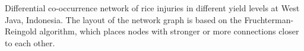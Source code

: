Differential co-occurrence network of rice injuries in different yield levels at West Java, Indonesia. The layout of the network graph is based on the Fruchterman-Reingold algorithm, which places nodes with stronger or more connections closer to each other.
        \label{fig:difyieldWJ}